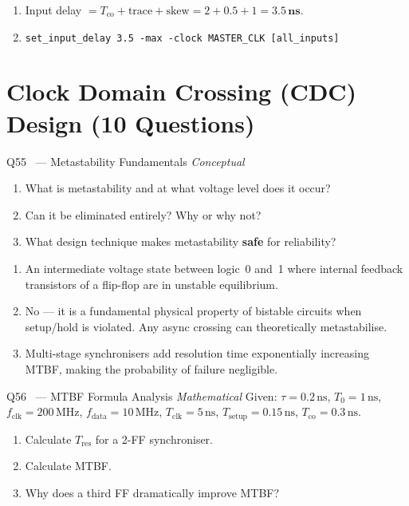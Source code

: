 \documentclass[12pt,a4paper]{article}
\newcommand{\advanced}{%
  \fbox{\textcolor{advred}{\bfseries\sffamily\small ADVANCED}}}
\newcommand{\moderate}{%
  \fbox{\textcolor{modoran}{\bfseries\sffamily\small MODERATE}}}
\begin{document}
\begin{answerbox}
\begin{enumerate}[label=\textbf{\alph*)}]
  \item Input delay $= T_{\text{co}} + \text{trace} + \text{skew} = 2 + 0.5 + 1 = \mathbf{3.5\,ns}$.
  \item \texttt{set\_input\_delay 3.5 -max -clock MASTER\_CLK [all\_inputs]}
\end{enumerate}
\end{answerbox}

\section{Clock Domain Crossing (CDC) Design (10 Questions)}
\label{sec:cdc}

\begin{questionbox}{Q55 \moderate\ --- Metastability Fundamentals \hfill\textit{Conceptual}}
\begin{enumerate}[label=\textbf{\alph*)}]
  \item What is metastability and at what voltage level does it occur?
  \item Can it be eliminated entirely? Why or why not?
  \item What design technique makes metastability \textbf{safe} for reliability?
\end{enumerate}
\end{questionbox}

\begin{answerbox}
\begin{enumerate}[label=\textbf{\alph*)}]
  \item An intermediate voltage state between logic~0 and~1 where internal feedback transistors of a flip-flop are in unstable equilibrium.
  \item No --- it is a fundamental physical property of bistable circuits when setup/hold is violated. Any async crossing can theoretically metastabilise.
  \item Multi-stage synchronisers add resolution time exponentially increasing MTBF, making the probability of failure negligible.
\end{enumerate}
\end{answerbox}

\begin{questionbox}{Q56 \advanced\ --- MTBF Formula Analysis \hfill\textit{Mathematical}}
Given: $\tau=0.2\,\text{ns}$, $T_0=1\,\text{ns}$, $f_{\text{clk}}=200\,\text{MHz}$, $f_{\text{data}}=10\,\text{MHz}$, $T_{\text{clk}}=5\,\text{ns}$, $T_{\text{setup}}=0.15\,\text{ns}$, $T_{\text{co}}=0.3\,\text{ns}$.
\begin{enumerate}[label=\textbf{\alph*)}]
  \item Calculate $T_{\text{res}}$ for a 2-FF synchroniser.
  \item Calculate MTBF.
  \item Why does a third FF dramatically improve MTBF?
\end{enumerate}
\end{questionbox}
\end{document}
